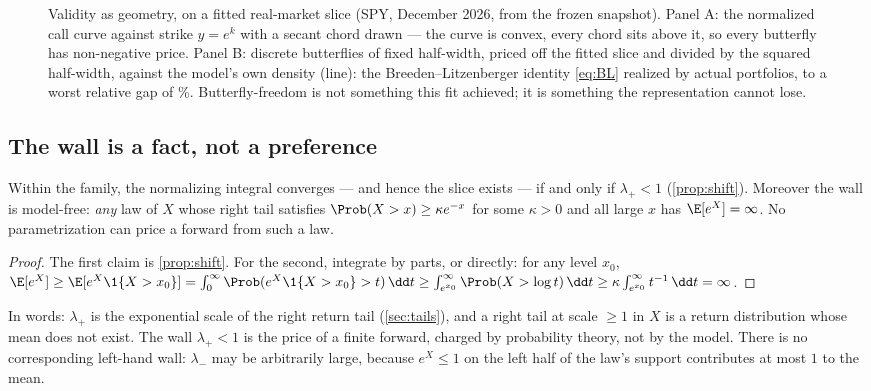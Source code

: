 \begin{figure}[htbp]
\centering
{}
\caption{Validity as geometry, on a fitted real-market slice (SPY, December
2026, from the frozen snapshot).  Panel A: the normalized call curve
against strike $y=e^k$ with a secant chord drawn --- the curve is convex,
every chord sits above it, so every butterfly has non-negative price.
Panel B: discrete butterflies of fixed half-width, priced off the fitted
slice and divided by the squared half-width, against the model's own
density (line): the Breeden--Litzenberger identity \eqref{eq:BL} realized
by actual portfolios, to a worst relative gap of
\MacButterflyDensityRelErrPct\%.  Butterfly-freedom is not something this
fit achieved; it is something the representation cannot lose.}
\label{fig:butterfly}
\end{figure}

\subsection{The wall is a fact, not a preference}

\begin{proposition}
\label{prop:wall}
Within the family, the normalizing integral converges --- and hence the
slice exists --- if and only if $\lambda_+<1$ (\cref{prop:shift}).
Moreover the wall is model-free: \emph{any} law of $X$ whose right tail
satisfies $\Prob(X>x)\ge\kappa e^{-x}$ for some $\kappa>0$ and all large
$x$ has $\E[e^{X}]=\infty$.  No parametrization can price a forward from
such a law.
\end{proposition}

\begin{proof}
The first claim is \cref{prop:shift}.  For the second, integrate by parts,
or directly: for any level $x_0$,
$\E[e^{X}]\ge\E[e^{X}\1\{X>x_0\}]
=\int_0^\infty \Prob(e^{X}\1\{X>x_0\}>t)\,\dd t
\ge\int_{e^{x_0}}^{\infty}\Prob(X>\log t)\,\dd t
\ge\kappa\int_{e^{x_0}}^{\infty}t^{-1}\,\dd t=\infty$.
\end{proof}

In words: $\lambda_+$ is the exponential scale of the right return tail
(\cref{sec:tails}), and a right tail at scale $\ge1$ in $X$ is a return
distribution whose mean does not exist.  The wall $\lambda_+<1$ is the
price of a finite forward, charged by probability theory, not by the
model.  There is no corresponding left-hand wall: $\lambda_-$ may be
arbitrarily large, because $e^{X}\le1$ on the left half of the law's
support contributes at most $1$ to the mean.

